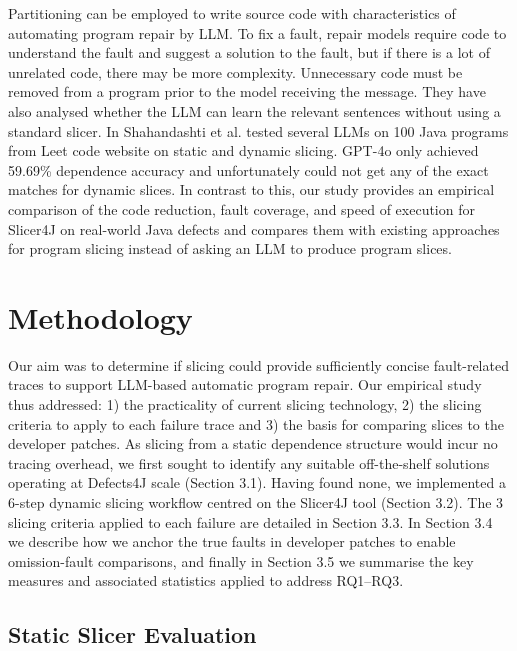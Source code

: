 \documentclass[sigconf,nonacm]{acmart}
\begin{document}
Partitioning can be employed to write source code with characteristics of automating program repair by LLM. To fix a fault, repair models require code to understand the fault and suggest a solution to the fault, but if there is a lot of unrelated code, there may be more complexity. Unnecessary code must be removed from a program prior to the model receiving the message. They have also analysed whether the LLM can learn the relevant sentences without using a standard slicer. In \cite{Shahandashti2024LLM} Shahandashti et al. tested several LLMs on 100 Java programs from Leet code website on static and dynamic slicing. GPT-4o only achieved 59.69\% dependence accuracy and unfortunately could not get any of the exact matches for dynamic slices. In contrast to this, our study provides an empirical comparison of the code reduction, fault coverage, and speed of execution for Slicer4J on real-world Java defects and compares them with existing approaches for program slicing instead of asking an LLM to produce program slices.

\section{Methodology}

Our aim was to determine if slicing could provide sufficiently concise fault-related traces to support LLM-based automatic program repair. Our empirical study thus addressed: 1) the practicality of current slicing technology, 2) the slicing criteria to apply to each failure trace and 3) the basis for comparing slices to the developer patches. As slicing from a static dependence structure would incur no tracing overhead, we first sought to identify any suitable off-the-shelf solutions operating at Defects4J scale (Section 3.1). Having found none, we implemented a 6-step dynamic slicing workflow centred on the Slicer4J tool \cite{Ahmed2021Slicer4J} (Section 3.2). The 3 slicing criteria applied to each failure are detailed in Section 3.3. In Section 3.4 we describe how we anchor the true faults in developer patches to enable omission-fault comparisons, and finally in Section 3.5 we summarise the key measures and associated statistics applied to address RQ1--RQ3.

\subsection{Static Slicer Evaluation}
\end{document}

